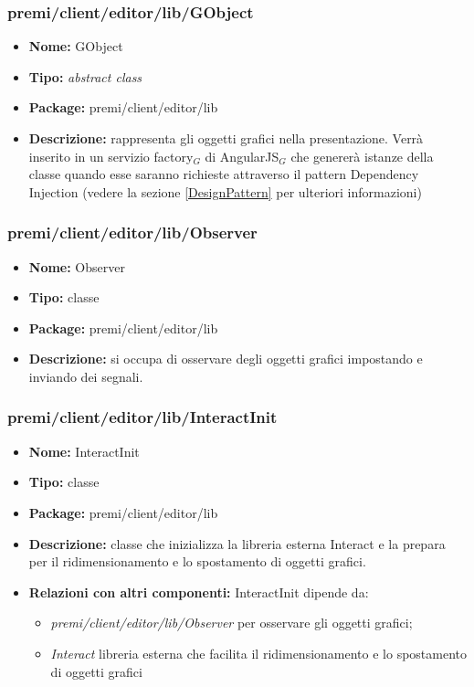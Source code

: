 \subsubsection{premi/client/editor/lib/GObject}
\begin{itemize}
  \item[] \textbf{Nome:} GObject
  \item[] \textbf{Tipo:} \textit{abstract class}
  \item[] \textbf{Package:} premi/client/editor/lib
  \item[] \textbf{Descrizione:} rappresenta gli oggetti grafici nella presentazione. Verrà inserito in un servizio factory$_G$ di AngularJS$_G$ che genererà istanze della classe quando esse saranno richieste attraverso il pattern Dependency Injection (vedere la sezione \ref{DesignPattern} per ulteriori informazioni)
\end{itemize}
\subsubsection{premi/client/editor/lib/Observer}
\begin{itemize}
  \item[] \textbf{Nome:} Observer
  \item[] \textbf{Tipo:} classe
  \item[] \textbf{Package:} premi/client/editor/lib
  \item[] \textbf{Descrizione:} si occupa di osservare degli oggetti grafici impostando e inviando dei segnali.
\end{itemize}
\subsubsection{premi/client/editor/lib/InteractInit}
\begin{itemize}
  \item[] \textbf{Nome:} InteractInit
  \item[] \textbf{Tipo:} classe
  \item[] \textbf{Package:} premi/client/editor/lib
  \item[] \textbf{Descrizione:} classe che inizializza la libreria esterna Interact e la prepara per il ridimensionamento e lo spostamento di oggetti grafici.
  \item[] \textbf{Relazioni con altri componenti:} InteractInit dipende da:
  \begin{itemize}
  	\item \textit{premi/client/editor/lib/Observer} per osservare gli oggetti grafici;
  	\item \textit{Interact} libreria esterna che facilita il ridimensionamento e lo spostamento di oggetti grafici
  \end{itemize}
\end{itemize}
